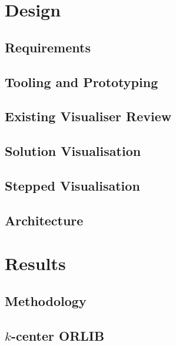 \documentclass{article}
\begin{document}
\section{Design}\label{section:design}
    \subsection{Requirements}\label{section:requirements}
    
    
    \subsection{Tooling and Prototyping}\label{section:prototype}
    
    
    \subsection{Existing Visualiser Review}\label{section:visualiser_review}
    
    
    \subsection{Solution Visualisation}\label{section:solution_visualisation}
    
    
    \subsection{Stepped Visualisation}\label{section:stepped_visualisation}
    
    
    \subsection{Architecture}\label{section:architecture}
    

\section{Results}\label{section:results}
    \subsection{Methodology}\label{section:methodology}
    
    
    \subsection{\texorpdfstring{$k$}{k}-center ORLIB}\label{section:k_center_orlib}
    
    
\end{document}
